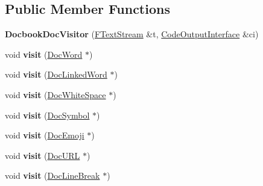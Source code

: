 \subsection*{Public Member Functions}
\begin{DoxyCompactItemize}
\item 
\mbox{\label{class_docbook_doc_visitor_a559b9cfe0badf00f1756eaeb991d4509}} 
{\bfseries Docbook\+Doc\+Visitor} (\mbox{\hyperlink{class_f_text_stream}{F\+Text\+Stream}} \&t, \mbox{\hyperlink{class_code_output_interface}{Code\+Output\+Interface}} \&ci)
\item 
\mbox{\label{class_docbook_doc_visitor_a61416a9e72acfd363c870dde3e349153}} 
void {\bfseries visit} (\mbox{\hyperlink{class_doc_word}{Doc\+Word}} $\ast$)
\item 
\mbox{\label{class_docbook_doc_visitor_ab8b99deb92d1e79e4ed88c6952a3535a}} 
void {\bfseries visit} (\mbox{\hyperlink{class_doc_linked_word}{Doc\+Linked\+Word}} $\ast$)
\item 
\mbox{\label{class_docbook_doc_visitor_a8e86ebc50dece60a1037979f9122b0e5}} 
void {\bfseries visit} (\mbox{\hyperlink{class_doc_white_space}{Doc\+White\+Space}} $\ast$)
\item 
\mbox{\label{class_docbook_doc_visitor_afb3421227804418869f484261f0a7a13}} 
void {\bfseries visit} (\mbox{\hyperlink{class_doc_symbol}{Doc\+Symbol}} $\ast$)
\item 
\mbox{\label{class_docbook_doc_visitor_a643cac7676075d5fcbeb27f47a8bb5c6}} 
void {\bfseries visit} (\mbox{\hyperlink{class_doc_emoji}{Doc\+Emoji}} $\ast$)
\item 
\mbox{\label{class_docbook_doc_visitor_a93d7ea7e679f0579269706b25d0bff04}} 
void {\bfseries visit} (\mbox{\hyperlink{class_doc_u_r_l}{Doc\+U\+RL}} $\ast$)
\item 
\mbox{\label{class_docbook_doc_visitor_a0561024b6dd9eb0703e7d904d0bdec25}} 
void {\bfseries visit} (\mbox{\hyperlink{class_doc_line_break}{Doc\+Line\+Break}} $\ast$)
\item 

\end{DoxyCompactItemize}
